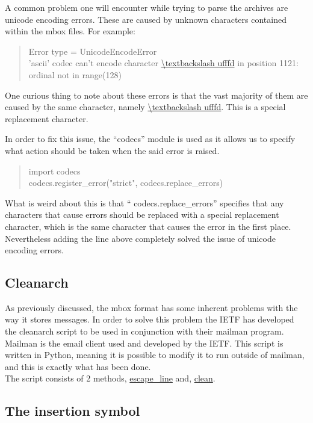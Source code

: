 \documentclass[a4paper,english]{report}
\begin{document}
A common problem one will encounter while trying to parse the archives  are unicode encoding errors. These are caused by unknown characters contained within the mbox files.  
For example:\\

\begin{quotation}
Error type = UnicodeEncodeError\\
'ascii' codec can't encode character \url{\textbackslash ufffd} in position 1121: ordinal not in range(128)
\end{quotation}

One curious thing to note about these errors is that the vast majority of them are caused by the same character, namely \url{\textbackslash ufffd}. This is  a special replacement character.

In order to fix this issue, the “codecs” module is used as it allows us to specify what action should be taken when the said error is raised.\\ 
\begin{quotation}
\noindent
import codecs\\
codecs.register\_error("strict", codecs.replace\_errors)\\
\end{quotation}
What is weird about this is that “ codecs.replace\_errors” specifies that any characters that cause errors should be replaced with a special replacement character, which is the same character that causes the error in the first place.\\
Nevertheless adding the line above completely solved the issue of unicode encoding errors.


\subsection{Cleanarch}

As previously discussed, the mbox format has some inherent problems with the way it stores messages. In order to solve this problem the IETF has developed the cleanarch script to be used in conjunction with their mailman program. Mailman is the email client used and developed by the IETF.
This script is written in Python, meaning it is possible to modify it to run outside of mailman, and this is exactly what has been done.\\

The script consists of 2 methods, \url{escape_line} and, \url{clean}.\

\subsection{The insertion symbol }
\end{document}

